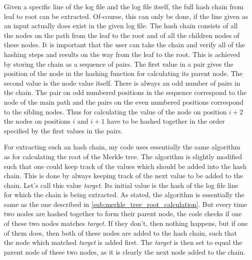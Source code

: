 \documentclass[11pt]{article}
\begin{document}
Given a specific line of the log file and the log file itself, the full hash chain from leaf to root can be extracted. Of-course, this can only be done, if the line given as an input actually does exist in the given log file. The hash chain consists of all the nodes on the path from the leaf to the root and of all the children nodes of these nodes. It is important that the user can take the chain and verify all of the hashing steps and results on the way from the leaf to the root. This is achieved by storing the chain as a sequence of pairs. The first value in a pair gives the position of the node in the hashing function for calculating its parent node. The second value is the node value itself. There is always an odd number of pairs in the chain. The pair on odd numbered positions in the sequence correspond to the node of the main path and the pairs on the even numbered positions correspond to the sibling nodes. Thus for calculating the value of the node on position $i+2$ the nodes on positions $i$ and $i+1$ have to be hashed together in the order specified by the first values in the pairs. 

For extracting such an hash chain, my code uses essentially the same algorithm as for calculating the root of the Merkle tree. The algorithm is slightly modified such that one could keep track of the values which should be added into the hash chain. This is done by always keeping track of the next value to be added to the chain. Let's call this value \emph{target}. Its initial value is the hash of the log file line for which the chain is being extracted. As stated, the algorithm is essentially the same as the one described in \cref{sub:merkle_tree_root_calculation}. But every time two nodes are hashed together to form their parent node, the code checks if one of these two nodes matches \emph{target}. If they don't, then nothing happens, but if one of them does, then both of these nodes are added to the hash chain, such that the node which matched \emph{target} is added first. The \emph{target} is then set to equal the parent node of these two nodes, as it is clearly the next node added to the chain.







\end{document}
